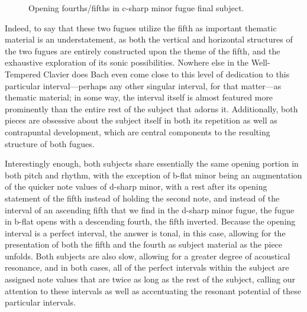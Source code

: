 \begin{figure}[H]
    \begin{center}
    \caption{Opening fourths/fifths in c-sharp minor fugue final subject. }
    \end{center}
\end{figure}
    

    \begin{center}
    \end{center}
    
    Indeed, to say that these two fugues utilize the fifth as important
thematic material is an understatement, as both the vertical and
horizontal structures of the two fugues are entirely constructed upon
the theme of the fifth, and the exhaustive exploration of its sonic
possibilities. Nowhere else in the Well-Tempered Clavier does Bach even
come close to this level of dedication to this particular
interval---perhaps any other singular interval, for that
matter---as thematic material; in some way, the interval itself is
almost featured more prominently than the entire rest of the subject
that adorns it. Additionally, both pieces are obsessive about the
subject itself in both its repetition as well as contrapuntal
development, which are central components to the resulting structure of
both fugues.

Interestingly enough, both subjects share essentially the same opening
portion in both pitch and rhythm, with the exception of b-flat minor
being an augmentation of the quicker note values of d-sharp minor, with
a rest after its opening statement of the fifth instead of holding the
second note, and instead of the interval of an ascending fifth that we
find in the d-sharp minor fugue, the fugue in b-flat opens with a
descending fourth, the fifth inverted. Because the opening interval is a
perfect interval, the answer is tonal, in this case, allowing for the
presentation of both the fifth and the fourth as subject material as the
piece unfolds. Both subjects are also slow, allowing for a greater
degree of acoustical resonance, and in both cases, all of the perfect
intervals within the subject are assigned note values that are twice as
long as the rest of the subject, calling our attention to these
intervals as well as accentuating the resonant potential of these
particular intervals.

